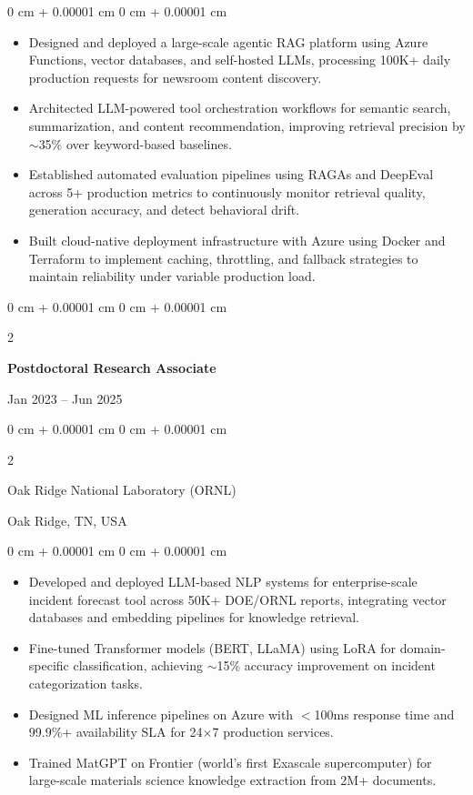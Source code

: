 \documentclass[10pt, letterpaper]{article}
\newenvironment{highlights}{
    \begin{itemize}[
        topsep=0.10 cm,
        parsep=0.10 cm,
        partopsep=0pt,
        itemsep=0pt,
        leftmargin=0 cm + 10pt
    ]
}{
    \end{itemize}
} %
\newenvironment{onecolentry}{
    \begin{adjustwidth}{
        0 cm + 0.00001 cm
    }{
        0 cm + 0.00001 cm
    }
}{
    \end{adjustwidth}
} %
\newenvironment{twocolentry}[2][]{
    \onecolentry
    \def\secondColumn{#2}
    \setcolumnwidth{\fill, 4.5 cm}
    \begin{paracol}{2}
}{
    \switchcolumn \raggedleft \secondColumn
    \end{paracol}
    \endonecolentry
} %
\begin{document}
    \begin{onecolentry}
        \begin{highlights}
            \item Designed and deployed a large-scale agentic RAG platform using Azure Functions, vector databases, and self-hosted LLMs, processing 100K+ daily production requests for newsroom content discovery.
            \item Architected LLM-powered tool orchestration workflows for semantic search, summarization, and content recommendation, improving retrieval precision by $\sim$35\% over keyword-based baselines.
            \item Established automated evaluation pipelines using RAGAs and DeepEval across 5+ production metrics to continuously monitor retrieval quality, generation accuracy, and detect behavioral drift.
            \item Built cloud-native deployment infrastructure with Azure using Docker and Terraform to implement caching, throttling, and fallback strategies to maintain reliability under variable production load.
        \end{highlights}
    \end{onecolentry}

    \vspace{1mm}

    \begin{twocolentry}{Jan 2023 -- Jun 2025}
        \textbf{Postdoctoral Research Associate}
    \end{twocolentry}
    \begin{twocolentry}{Oak Ridge, TN, USA}
        Oak Ridge National Laboratory (ORNL)
    \end{twocolentry}
    \vspace{0.10 cm}
    \begin{onecolentry}
        \begin{highlights}
            \item Developed and deployed LLM-based NLP systems for enterprise-scale incident forecast tool across 50K+ DOE/ORNL reports, integrating vector databases and embedding pipelines for knowledge retrieval.
            \item Fine-tuned Transformer models (BERT, LLaMA) using LoRA for domain-specific classification, achieving $\sim$15\% accuracy improvement on incident categorization tasks.
            \item Designed ML inference pipelines on Azure with $<$100ms response time and 99.9\%+ availability SLA for 24$\times$7 production services.
            \item Trained MatGPT on Frontier (world's first Exascale supercomputer) for large-scale materials science knowledge extraction from 2M+ documents.
        \end{highlights}
    \end{onecolentry}
\end{document}
